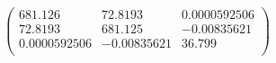 \documentclass{article}
\begin{document}
\[\left(
\begin{array}{ccc}
 681.126 & 72.8193 & 0.0000592506 \\
 72.8193 & 681.125 & -0.00835621 \\
 0.0000592506 & -0.00835621 & 36.799 \\
\end{array}
\right)\]
\end{document}
